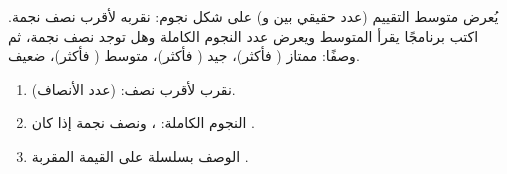 \begin{statement}
يُعرض متوسط التقييم (عدد حقيقي بين  و) على شكل نجوم: نقربه لأقرب نصف نجمة. اكتب برنامجًا يقرأ المتوسط ويعرض عدد النجوم الكاملة وهل توجد نصف نجمة، ثم وصفًا: ممتاز ( فأكثر)، جيد ( فأكثر)، متوسط ( فأكثر)، ضعيف.
\end{statement}
\begin{stepsbox}\begin{enumerate}
\item نقرب لأقرب نصف:  (عدد الأنصاف).
\item النجوم الكاملة: ، ونصف نجمة إذا كان .
\item الوصف بسلسلة  على القيمة المقربة .
\end{enumerate}\end{stepsbox}
